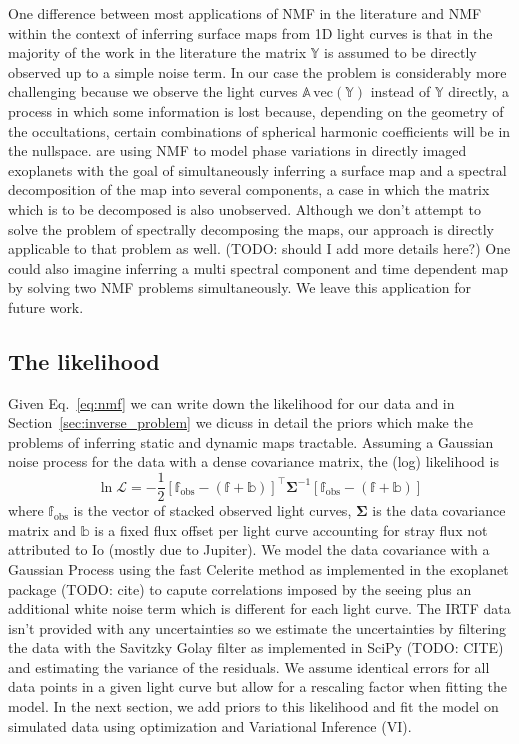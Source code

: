 \documentclass[modern]{aastex62}
\begin{document}
One difference between most applications of NMF in the literature and NMF within the context of inferring surface maps from 1D light curves is that
in the majority of the work in the literature \citep[except][]{kawahara_global_2020} the matrix $\mathbb{Y}$ is assumed to be directly observed  up to a simple noise term.
In our case the problem is considerably more challenging because we observe the light curves
$\mathbb{A}\,\mathrm{vec}(\mathbf{\mathbb{Y}})$ instead of $\mathbb{Y}$ directly, a process in which some information is lost because, depending on the geometry of the occultations, certain combinations of spherical harmonic coefficients will be in the nullspace.
\cite{kawahara_global_2020} are using NMF to model phase variations in directly imaged exoplanets with the goal of simultaneously inferring a surface map and a spectral decomposition of the map into several components, a case in which the
matrix which is to be decomposed is also unobserved.
Although we don't attempt to solve the problem of spectrally decomposing the maps, our approach is directly applicable to that problem as well. (TODO: should I add more details here?)
One could also imagine inferring a multi spectral component and time dependent map by solving two NMF problems simultaneously.
We leave this application for future work.


\subsection{The likelihood}
\label{ssec:likelihood}
Given Eq.~\ref{eq:nmf} we can write down the likelihood for our data and in Section~\ref{sec:inverse_problem} we dicuss in detail the priors which make the problems of inferring static and dynamic maps tractable.
Assuming a Gaussian noise process for the data with a dense covariance matrix, the (log) likelihood is
\begin{equation}
    \ln\mathcal{L}=-\frac{1}{2}\left[\mathbb{f}_\mathrm{obs}-(\mathbb{f} + \mathbb{b})\right]^{\top} \boldsymbol{\Sigma}^{-1}\left[\mathbb{f}_\mathrm{obs}-(\mathbb{f} + \mathbb{b})\right]
\end{equation}
where $\mathbb{f}_\mathrm{obs}$ is the vector of stacked observed light curves, $\boldsymbol{\Sigma}$ is the data covariance matrix and $\mathbb{b}$ is a fixed flux offset per light curve accounting for stray flux not attributed to Io (mostly due to Jupiter).
We model the data covariance with a Gaussian Process using the fast Celerite method\citep{foreman-mackey_fast_2017} as implemented in the \textsf{exoplanet} package (TODO: cite) to capute correlations imposed by the seeing plus an additional white noise term which is different for each light curve.
The IRTF data isn't provided with any uncertainties so we estimate the uncertainties by filtering the data with the Savitzky Golay filter as implemented in \textsf{SciPy} (TODO: CITE) and estimating the variance of the residuals.
We assume identical errors for all data points in a given light curve but allow for a rescaling factor when fitting the model.
In the next section, we add priors to this likelihood and fit the model on simulated data using optimization and Variational Inference (VI).
\end{document}
